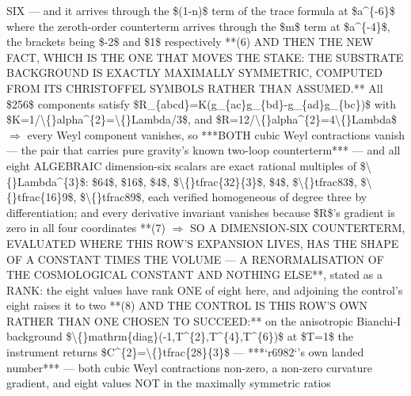 \begin{description}
SIX --- and it arrives through the \$(1-n)\$ term of the trace formula at \$a\textasciicircum{}\{-6\}\$ where the zeroth-order counterterm arrives through the \$m\$ term at \$a\textasciicircum{}\{-4\}\$, the brackets being \$-2\$ and \$1\$ respectively  **(6)  AND THEN THE NEW FACT, WHICH IS THE ONE THAT MOVES THE STAKE: THE SUBSTRATE BACKGROUND IS EXACTLY MAXIMALLY SYMMETRIC, COMPUTED FROM ITS CHRISTOFFEL SYMBOLS RATHER THAN ASSUMED.** All \$256\$ components satisfy \$R\_\{abcd\}=K(g\_\{ac\}g\_\{bd\}-g\_\{ad\}g\_\{bc\})\$ with \$K=1/\textbackslash\{\}alpha\textasciicircum{}\{2\}=\textbackslash\{\}Lambda/3\$, and \$R=12/\textbackslash\{\}alpha\textasciicircum{}\{2\}=4\textbackslash\{\}Lambda\$ \ensuremath{\Rightarrow} every Weyl component vanishes, so ***BOTH cubic Weyl contractions vanish --- the pair that carries pure gravity's known two-loop counterterm*** --- and all eight ALGEBRAIC dimension-six scalars are exact rational multiples of \$\textbackslash\{\}Lambda\textasciicircum{}\{3\}\$: \$64\$, \$16\$, \$4\$, \$\textbackslash\{\}tfrac\{32\}\{3\}\$, \$4\$, \$\textbackslash\{\}tfrac83\$, \$\textbackslash\{\}tfrac\{16\}9\$, \$\textbackslash\{\}tfrac89\$, each verified homogeneous of degree three by differentiation; and every derivative invariant vanishes because \$R\$'s gradient is zero in all four coordinates  **(7) \ensuremath{\Rightarrow} SO A DIMENSION-SIX COUNTERTERM, EVALUATED WHERE THIS ROW'S EXPANSION LIVES, HAS THE SHAPE OF A CONSTANT TIMES THE VOLUME --- A RENORMALISATION OF THE COSMOLOGICAL CONSTANT AND NOTHING ELSE**, stated as a RANK: the eight values have rank ONE of eight here, and adjoining the control's eight raises it to two  **(8) AND THE CONTROL IS THIS ROW'S OWN RATHER THAN ONE CHOSEN TO SUCCEED:** on the anisotropic Bianchi-I background \$\textbackslash\{\}mathrm\{diag\}(-1,T\textasciicircum{}\{2\},T\textasciicircum{}\{4\},T\textasciicircum{}\{6\})\$ at \$T=1\$ the instrument returns \$C\textasciicircum{}\{2\}=\textbackslash\{\}tfrac\{28\}\{3\}\$ --- ***`r6982`'s own landed number*** --- both cubic Weyl contractions non-zero, a non-zero curvature gradient, and eight values NOT in the maximally symmetric ratios

\end{description}
